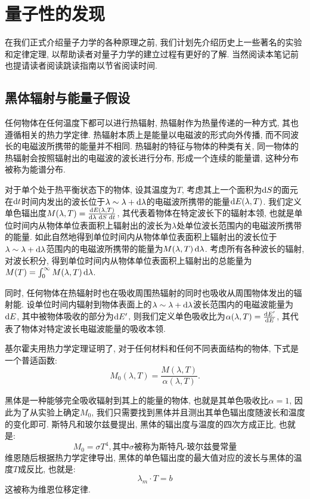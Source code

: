 \graphicspath{{figure/}}
\chapter{量子性的发现}
在我们正式介绍量子力学的各种原理之前, 我们计划先介绍历史上一些著名的实验和定律定理, 以帮助读者对量子力学的建立过程有更好的了解. 当然阅读本笔记前也提请读者阅读跳读指南以节省阅读时间.
\section{黑体辐射与能量子假设}
任何物体在任何温度下都可以进行热辐射, 热辐射作为热量传递的一种方式, 其也遵循相关的热力学定律. 热辐射本质上是能量以电磁波的形式向外传播, 而不同波长的电磁波所携带的能量并不相同. 热辐射的特征与物体的种类有关, 同一物体的热辐射会按照辐射出的电磁波的波长进行分布, 形成一个连续的能量谱, 这种分布被称为能谱分布.

对于单个处于热平衡状态下的物体, 设其温度为$T$, 考虑其上一个面积为$\mathop{}\!\mathrm{d} S$的面元在$\mathop{}\!\mathrm{d} t$时间内发出的波长位于$\lambda\sim \lambda+\mathop{}\!\mathrm{d} \lambda$的电磁波所携带的能量$\mathop{}\!\mathrm{d} E(\lambda, T)$. 我们定义单色辐出度$M(\lambda, T)=\frac{\mathop{}\!\mathrm{d} E(\lambda, T)}{\mathop{}\!\mathrm{d} \lambda\,\mathop{}\!\mathrm{d} S\,\mathop{}\!\mathrm{d} t}$, 其代表着物体在特定波长下的辐射本领, 也就是单位时间内从物体单位表面积上辐射出的波长为$\lambda$处单位波长范围内的电磁波所携带的能量. 如此自然地得到单位时间内从物体单位表面积上辐射出的波长位于$\lambda\sim \lambda+\mathop{}\!\mathrm{d} \lambda$范围内的电磁波所携带的能量为$M(\lambda, T)\mathop{}\!\mathrm{d}\lambda$. 考虑所有各种波长的辐射, 对波长积分, 得到单位时间内从物体单位表面积上辐射出的总能量为$M(T)=\int^\infty_0 M(\lambda, T)\mathop{}\!\mathrm{d} \lambda$.

同时, 任何物体在热辐射时也在吸收周围热辐射的同时也吸收从周围物体发出的辐射能. 设单位时间内辐射到物体表面上的$\lambda\sim\lambda+\mathop{}\!\mathrm{d} \lambda$波长范围内的电磁波能量为$\mathop{}\!\mathrm{d} E$, 其中被物体吸收的部分为$\mathop{}\!\mathrm{d} E'$, 则我们定义单色吸收比为$\alpha(\lambda,T)=\frac{\mathop{}\!\mathrm{d} E'}{\mathop{}\!\mathrm{d} E}$, 其代表了物体对特定波长电磁波能量的吸收本领.

基尔霍夫用热力学定理证明了, 对于任何材料和任何不同表面结构的物体, 下式是一个普适函数:
\[
M_0(\lambda, T)=\frac{M(\lambda, T)}{\alpha(\lambda, T)}.
\]

黑体是一种能够完全吸收辐射到其上的能量的物体, 也就是其单色吸收比$\alpha=1$, 因此为了从实验上确定$M_0$, 我们只需要找到黑体并且测出其单色辐出度随波长和温度的变化即可. 斯特凡和玻尔兹曼提出, 黑体的辐出度与温度的四次方成正比, 也就是:
\[
M_0 = \sigma T^4, \text{其中$\sigma$被称为斯特凡-玻尔兹曼常量}
\]
维恩随后根据热力学定律导出, 黑体的单色辐出度的最大值对应的波长与黑体的温度$T$成反比, 也就是:
\[
\lambda_m \cdot T = b
\]
这被称为维恩位移定律.

